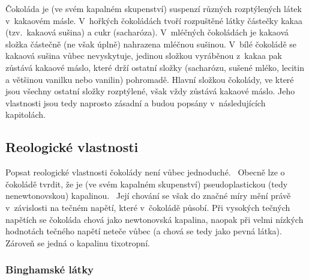 \documentclass[12pt]{article}
\begin{document}
Čokoláda je (ve svém kapalném skupenství) suspenzí různých rozptýlených látek v~kakaovém másle. V~hořkých čokoládách tvoří rozpuštěné látky částečky kakaa (tzv.~kakaová sušina) a cukr (sacharóza). V~mléčných čokoládách je kakaová složka částečně (ne však úplně) nahrazena mléčnou sušinou. V~bílé čokoládě se kakaová sušina vůbec nevyskytuje, jedinou složkou vyráběnou z~kakaa pak zůstává kakaové máslo, které drží ostatní složky (sacharózu, sušené mléko, lecitin a většinou vanilku nebo vanilin) pohromadě. Hlavní složkou čokolády, ve které jsou všechny ostatní složky rozptýlené, však vždy zůstává kakaové máslo. Jeho vlastnosti jsou tedy naprosto zásadní a budou popsány v~následujících kapitolách.~\cite{Article:chocolate_composition}\cite{Article:Determination_of_chocolate_viscosity}\cite{wiki:Chocolate}\cite{wiki:čokoláda}\cite{wiki:Bílá_čokoláda}

\subsection{Reologické vlastnosti}%
\label{sec:Reologické_vlastnosti_čokolády}%

Popsat reologické vlastnosti čokolády není vůbec jednoduché.~\cite{Article:Determination_of_chocolate_viscosity} Obecně lze o čokoládě tvrdit, že je (ve svém kapalném skupenství) pseudoplastickou (tedy nenewtonovskou) kapalinou.~\cite{Article:Comparison_of_models_chocolate}\cite{Article:Rapid_and_economic_chocolate_viscosity} Její chování se však do značné míry mění právě v~závislosti na tečném napětí, které v~čokoládě působí. Při vysokých tečných napětích se čokoláda chová jako newtonovská kapalina, naopak při velmi nízkých hodnotách tečného napětí neteče vůbec (a chová se tedy jako pevná látka). Zároveň se jedná o kapalinu tixotropní.~\cite{Article:Determination_of_chocolate_viscosity}

\subsubsection{Binghamské látky}%
\end{document}
